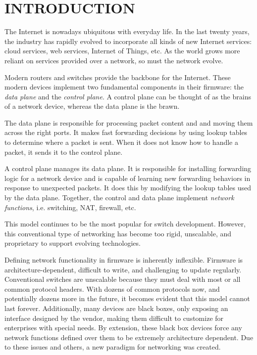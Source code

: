 \chapter{INTRODUCTION} \label{ch:intro}

%
%



The Internet is nowadays ubiquitous with everyday life. In the last twenty
years,
the industry has rapidly evolved to incorporate all kinds of new Internet
services:
cloud services, web services, Internet of Things, etc. As the world grows
more reliant on services provided over a network, so must the network evolve.

Modern routers and switches provide the backbone for the Internet.
These modern devices implement two fundamental components in their firmware: the
\emph{data plane} and the \emph{control plane}. A control plane can be thought of as the brains of a network device, whereas the
data plane is the brawn.

The data plane is responsible for processing packet content and and moving them across the right ports.
It makes fast forwarding decisions by using lookup tables to determine
where a packet is sent. When it does
not know how to handle a packet, it sends it to the control plane.

A control plane manages its data plane.
It is responsible for installing forwarding logic for a network device and is
capable of learning new forwarding behaviors in response to unexpected packets.
It does this by modifying the lookup tables used by the data plane.
Together, the control and data plane implement \emph{network functions}, i.e.
switching, NAT, firewall, etc.

This model continues to be the most popular for switch development.
However,
this conventional type of networking has become too rigid, unscalable, and
proprietary to support evolving technologies. 

Defining network functionality in firmware is inherently inflexible.
Firmware is architecture-dependent, difficult to write, and challenging to
update
regularly.
Conventional switches are unscalable because they must deal with most or all
common protocol headers.
With dozens of common protocols now, and potentially dozens more in the future,
it becomes evident that this model cannot last forever.
Additionally, many devices are black boxes,
only exposing an interface designed by the vendor,
making them difficult to customize for enterprises with special needs.
By extension, these black box devices force any network functions
defined over them to be extremely architecture dependent.
Due to these issues and others, a new paradigm for networking was created. 

